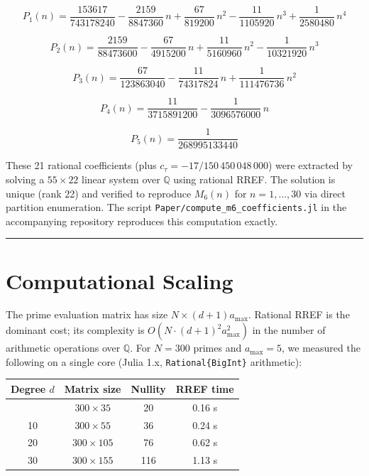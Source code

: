 \documentclass[
  11pt,
]{article}
\newcounter{none} %
\begin{document}
\[P_1(n) = \frac{153617}{743178240} - \frac{2159}{8847360}\,n + \frac{67}{819200}\,n^2 - \frac{11}{1105920}\,n^3 + \frac{1}{2580480}\,n^4\]

\[P_2(n) = \frac{2159}{88473600} - \frac{67}{4915200}\,n + \frac{11}{5160960}\,n^2 - \frac{1}{10321920}\,n^3\]

\[P_3(n) = \frac{67}{123863040} - \frac{11}{74317824}\,n + \frac{1}{111476736}\,n^2\]

\[P_4(n) = \frac{11}{3715891200} - \frac{1}{3096576000}\,n\]

\[P_5(n) = \frac{1}{268995133440}\]

These 21 rational coefficients (plus
\(c_\tau = -17/150\,450\,048\,000\)) were extracted by solving a
\(55 \times 22\) linear system over \(\mathbb{Q}\) using rational RREF.
The solution is unique (rank 22) and verified to reproduce \(M_6(n)\)
for \(n = 1, \ldots, 30\) via direct partition enumeration. The script
\texttt{Paper/compute\_m6\_coefficients.jl} in the accompanying
repository reproduces this computation exactly.

\begin{center}\rule{0.5\linewidth}{0.5pt}\end{center}

\section{Computational Scaling}\label{computational-scaling}

The prime evaluation matrix has size \(N \times (d+1)a_{\max}\).
Rational RREF is the dominant cost; its complexity is
\(O(N \cdot (d+1)^2 a_{\max}^2)\) in the number of arithmetic operations
over \(\mathbb{Q}\). For \(N = 300\) primes and \(a_{\max} = 5\), we
measured the following on a single core (Julia 1.x,
\texttt{Rational\{BigInt\}} arithmetic):

{\def\LTcaptype{none} %
\begin{longtable}[]{@{}cccc@{}}
\toprule\noalign{}
Degree \(d\) & Matrix size & Nullity & RREF time \\
\midrule\noalign{}
\endhead
\bottomrule\noalign{}
\endlastfoot
6 & \(300 \times 35\) & 20 & 0.16 s \\
10 & \(300 \times 55\) & 36 & 0.24 s \\
20 & \(300 \times 105\) & 76 & 0.62 s \\
30 & \(300 \times 155\) & 116 & 1.13 s \\
\end{longtable}
}
\end{document}
